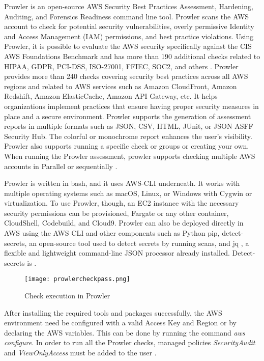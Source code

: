 {\hfill \break
\par Prowler is an open-source AWS Security Best Practices Assessment, Hardening, Auditing, and Forensics Readiness command line tool.
Prowler scans the AWS account to check for potential security vulnerabilities, overly permissive Identity and Access Management (IAM) permissions, and best practice violations.
Using Prowler, it is possible to evaluate the AWS security specifically against the CIS AWS Foundations Benchmark and has more than 190 additional checks related to HIPAA, GDPR, PCI-DSS, ISO-27001, FFIEC, SOC2, and others \cite{75}.
Prowler provides more than 240 checks covering security best practices across all AWS regions and related to AWS services such as Amazon CloudFront, Amazon Redshift, Amazon ElasticCache, Amazon API Gateway, etc.
It helps organizations implement practices that ensure
having proper security measures in place and a secure
environment.
Prowler supports the generation of assessment reports in multiple formats such as JSON, CSV, HTML, JUnit, or JSON ASFF Security Hub.
The colorful or monochrome report enhances the user’s visibility.
Prowler also supports running a specific check or groups or creating your own.
When running the Prowler assessment, prowler supports
checking multiple AWS accounts in Parallel or
sequentially \cite{78}.\\
\hfill \break
\par Prowler is written in bash, and it uses AWS-CLI
underneath.
It works with multiple operating systems such
as macOS, Linux, or Windows with Cygwin or virtualization.
To use Prowler, though, an EC2 instance with the necessary security permissions can be provisioned, Fargate or any other container, CloudShell, Codebuild, and Cloud9.
Prowler can also be deployed directly in AWS using the AWS
CLI and other components such as Python pip,
detect-secrets, an open-source tool used to detect secrets by running scans, and jq , a flexible and lightweight command-line JSON processor already installed.
Detect-secrets is  \cite{78}.
\hfill \break
\begin{figure}
    \centering
    \texttt{[image: prowlercheckpass.png]}
    \caption{Check execution in Prowler}
    \label{fig:prowlercheckexecution}
\end{figure}

\par After installing the required tools and packages
successfully, the AWS environment need be configured with
a valid Access Key and Region or by declaring the AWS
variables.
This can be done by running the command \textit{aws configure}.
In order to run all the Prowler checks, managed policies \textit{SecurityAudit} and \textit{ViewOnlyAccess} must be added to the user \cite{75}.



}
